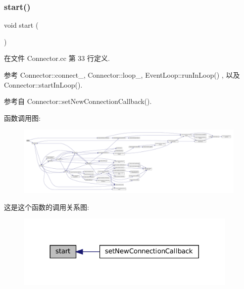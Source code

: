 \subsubsection{\texorpdfstring{start()}{start()}}
{\footnotesize\ttfamily void start (\begin{DoxyParamCaption}{ }\end{DoxyParamCaption})}



在文件 Connector.\+cc 第 33 行定义.



参考 Connector\+::connect\+\_\+, Connector\+::loop\+\_\+, Event\+Loop\+::run\+In\+Loop() , 以及 Connector\+::start\+In\+Loop().



参考自 Connector\+::set\+New\+Connection\+Callback().

函数调用图\+:
\nopagebreak
\begin{figure}[H]
\begin{center}
\leavevmode
\includegraphics[width=350pt]{classmuduo_1_1Connector_a60de64d75454385b23995437f1d72669_cgraph}
\end{center}
\end{figure}
这是这个函数的调用关系图\+:
\nopagebreak
\begin{figure}[H]
\begin{center}
\leavevmode
\includegraphics[width=305pt]{classmuduo_1_1Connector_a60de64d75454385b23995437f1d72669_icgraph}
\end{center}
\end{figure}
\mbox{\label{classmuduo_1_1Connector_ad289b54db652dcb10f835f3613e68fdb}} 
